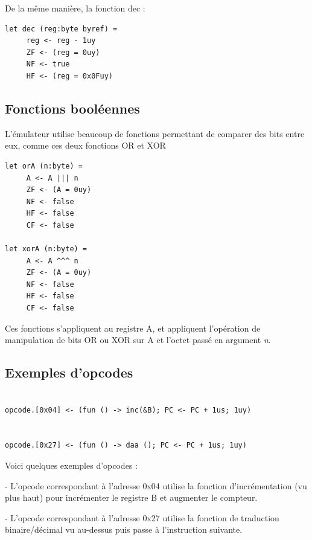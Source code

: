 \documentclass[12pt, a4paper]{article}
\begin{document}
De la même manière, la fonction dec :

\bigskip
\begin{lstlisting}[frame=single]
let dec (reg:byte byref) =
     reg <- reg - 1uy
     ZF <- (reg = 0uy) 
     NF <- true
     HF <- (reg = 0x0Fuy)
\end{lstlisting}

\pagebreak
\subsection{Fonctions booléennes}

L'émulateur utilise beaucoup de fonctions permettant de comparer des bits entre eux, comme ces deux fonctions OR et XOR

\bigskip
\small\begin{lstlisting}[frame=single]
let orA (n:byte) =
     A <- A ||| n 
     ZF <- (A = 0uy) 
     NF <- false
     HF <- false
     CF <- false 

let xorA (n:byte) =
     A <- A ^^^ n 
     ZF <- (A = 0uy) 
     NF <- false
     HF <- false
     CF <- false
\end{lstlisting}
\large

Ces fonctions s'appliquent au registre A, et appliquent l'opération de manipulation de bits OR ou XOR sur A et l'octet passé en argument \textit{n}.

\pagebreak

\subsection{Exemples d'opcodes}

\small{ \begin{lstlisting}[frame = single]

opcode.[0x04] <- (fun () -> inc(&B); PC <- PC + 1us; 1uy)


opcode.[0x27] <- (fun () -> daa (); PC <- PC + 1us; 1uy)
\end{lstlisting}}
\bigskip
\large

Voici quelques exemples d'opcodes :

\bigskip

- L'opcode correspondant à l'adresse 0x04 utilise la fonction  d'incrémentation (vu plus haut) pour incrémenter  le registre B et augmenter le compteur.

\bigskip

- L'opcode correspondant à l'adresse 0x27 utilise la fonction de traduction binaire/décimal vu au-dessus puis passe à l'instruction suivante.
\end{document}
